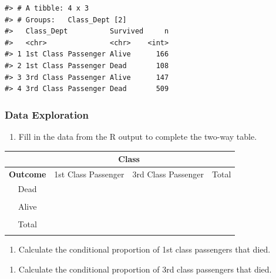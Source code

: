 \documentclass[
]{report}
\providecommand{\tightlist}{%
  \setlength{\itemsep}{0pt}\setlength{\parskip}{0pt}}
\begin{document}
\begin{verbatim}
#> # A tibble: 4 x 3
#> # Groups:   Class_Dept [2]
#>   Class_Dept          Survived     n
#>   <chr>               <chr>    <int>
#> 1 1st Class Passenger Alive      166
#> 2 1st Class Passenger Dead       108
#> 3 3rd Class Passenger Alive      147
#> 4 3rd Class Passenger Dead       509
\end{verbatim}

\newpage

\hypertarget{data-exploration}{%
\subsubsection*{Data Exploration}\label{data-exploration}}

\begin{enumerate}
\def\labelenumi{\arabic{enumi}.}
\tightlist
\item
  Fill in the data from the R output to complete the two-way table.
\end{enumerate}

\begin{center}
\begin{tabular}{|c|c|c|c|}
\hline
 & \multicolumn{2}{|c|}{\textbf{Class}} & \\ \hline
\textbf{Outcome} & 1st Class Passenger & 3rd Class Passenger & Total \\ \hline
 Dead & & &  \\ 
 & & & \\ \hline
 Alive & & &  \\ 
 & & & \\ \hline
 Total & & &  \\ 
 & & & \\ \hline  
\end{tabular}
\end{center}

\begin{enumerate}
\def\labelenumi{\arabic{enumi}.}
\setcounter{enumi}{1}
\tightlist
\item
  Calculate the conditional proportion of 1st class passengers that died.
\end{enumerate}

\vspace{0.8in}

\begin{enumerate}
\def\labelenumi{\arabic{enumi}.}
\setcounter{enumi}{2}
\tightlist
\item
  Calculate the conditional proportion of 3rd class passengers that died.
\end{enumerate}
\end{document}
